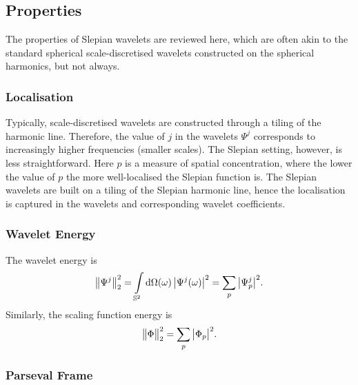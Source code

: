 

\subsection{Properties}\label{sec:chapter4_properties}

The properties of Slepian wavelets are reviewed here, which are often akin to the standard spherical scale-discretised wavelets constructed on the spherical harmonics, but not always.

\subsubsection{Localisation}\label{sec:chapter4_localisation}

Typically, scale-discretised wavelets are constructed through a tiling of the harmonic line.
Therefore, the value of \(j\) in the wavelets \(\Psi^{j}\) corresponds to increasingly higher frequencies (smaller scales).
The Slepian setting, however, is less straightforward.
Here \(p\) is a measure of spatial concentration, where the lower the value of \(p\) the more well-localised the Slepian function is.
The Slepian wavelets are built on a tiling of the Slepian harmonic line, hence the localisation is captured in the wavelets and corresponding wavelet coefficients.

\subsubsection{Wavelet Energy}

The wavelet energy is
%
\begin{equation}
	{\big\lVert\Psi^{j}\big\rVert}_{2}^{2}
	= \int\limits_{\mathbb{S}^{2}} \dd{\Omega(\omega)} \big\lvert\Psi^{j}(\omega)\big\rvert^{2}
	= \sum\limits_{p} \big\lvert{\Psi}_{p}^{j}\big\rvert^{2}.
\end{equation}
%
Similarly, the scaling function energy is
%
\begin{equation}
	{\big\lVert\Phi\big\rVert}_{2}^{2}
	= \sum\limits_{p} \big\lvert{\Phi}_{p}\big\rvert^{2}.
\end{equation}

\subsubsection{Parseval Frame}

